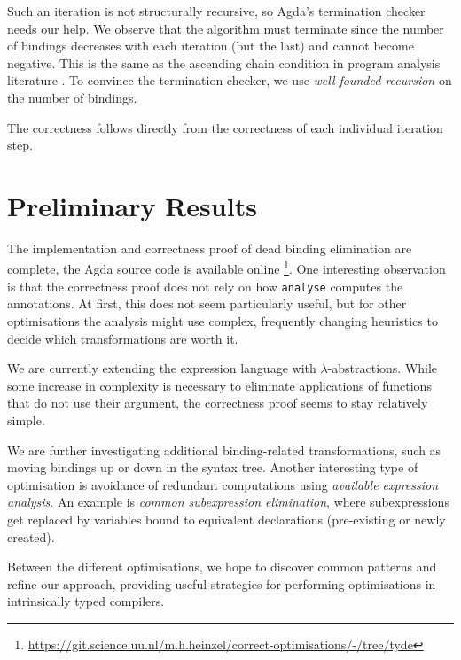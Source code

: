 \documentclass[sigplan,nonacm,screen]{acmart}
\newcommand{\I}[1]{\texttt{#1}\xspace}
\begin{document}
Such an iteration is not structurally recursive, so Agda's termination checker needs our help.
We observe that the algorithm must terminate
since the number of bindings decreases with each iteration (but the last) and cannot become negative.
This is the same as the ascending chain condition in program analysis literature
\cite{nielsen1999analysis}.
To convince the termination checker, we use \emph{well-founded recursion} \cite{bove2016recursion}
on the number of bindings.

The correctness follows directly from the correctness of each individual iteration step.

\section{Preliminary Results}

The implementation and correctness proof of dead binding elimination are complete,
the Agda source code is available online
\footnote{\url{https://git.science.uu.nl/m.h.heinzel/correct-optimisations/-/tree/tyde}}.
One interesting observation is that the correctness proof does not rely on how
\I{analyse} computes the annotations.
At first, this does not seem particularly useful,
but for other optimisations the analysis might use complex, frequently changing heuristics to decide
which transformations are worth it.

We are currently extending the expression language
with $\lambda$-abstractions.
While some increase in complexity is necessary to eliminate applications of functions that do not use their argument,
the correctness proof seems to stay relatively simple.

We are further investigating additional binding-related transformations,
such as moving bindings up or down in the syntax tree.
Another interesting type of optimisation is avoidance of redundant computations
using \emph{available expression analysis}.
An example is \emph{common subexpression elimination},
where subexpressions get replaced by variables bound to equivalent declarations
(pre-existing or newly created).

Between the different optimisations,
we hope to discover common patterns and refine our approach,
providing useful strategies for performing optimisations in intrinsically typed compilers.


{}
\end{document}

